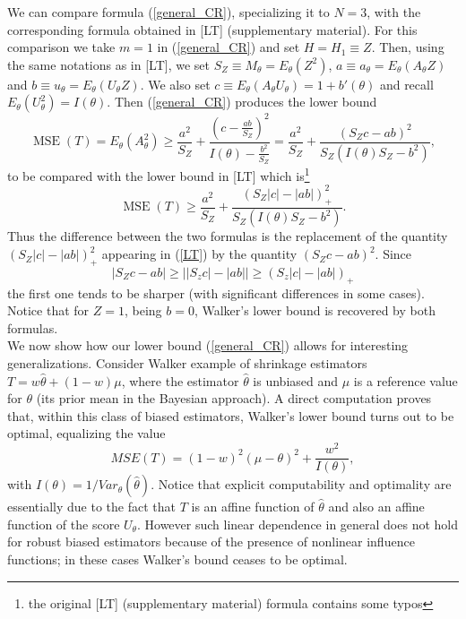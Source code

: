 \documentclass[11pt]{article}
\begin{document}
We can compare formula (\ref{general_CR}), specializing it  to $N=3$, with the corresponding formula obtained in [LT] (supplementary material). For this comparison we take $m=1$ in (\ref{general_CR}) and set $H=H_1\equiv Z$. Then, using the same notations as in [LT], we set
$S_Z\equiv M_\theta=E_\theta(Z^2)$, $a\equiv a_\theta=E_\theta(A_\theta Z)$ and $b\equiv u_\theta=E_\theta(U_\theta Z)$.
We also set $c\equiv E_\theta(A_\theta U_\theta)=1+b'(\theta)$ and recall $E_\theta(U_\theta^2)=I(\theta)$. Then (\ref{general_CR}) produces the lower bound
\begin{equation}\label{me}
\operatorname{MSE}(T)=E_\theta(A_\theta^2)
\geq
\frac{a^2}{S_Z}
+
\frac{
\left(
c-\frac{ab}{S_Z}
\right)^2
}{
I(\theta)-\frac{b^2}{S_Z}
}=\frac{a^2}{S_Z}
+
\frac{
\left(
S_Zc-ab
\right)^2
}{
S_Z\left(I(\theta)S_Z-b^2\right)
},
\end{equation}
to be compared with the lower bound in [LT] which is\footnote{the original [LT] (supplementary material) formula contains some typos}
\begin{equation}\label{LT}
\operatorname{MSE}(T)
\geq
\frac{a^2}{S_Z}
+
\frac{
\left(
S_Z|c|-|ab|
\right)_{+}^2
}{
S_Z\left(I(\theta)S_Z-b^2\right)
}.
\end{equation}
Thus the difference between the two formulas is the replacement of the quantity  $(S_Z|c|-|ab|)^2_{+}$ appearing in (\ref{LT}) by the quantity $(S_Zc-ab)^2$. Since
$$
|S_Zc-ab|\geq \bigg||S_zc|-|ab|\bigg|\geq (S_z|c|-|ab|)_{+}
$$
 the first one tends to be sharper (with significant differences  in some cases). Notice that for $Z=1$, being $b=0$, Walker's lower bound is recovered by both formulas.\\
We now show how our lower bound (\ref{general_CR}) allows for interesting generalizations. Consider Walker example of shrinkage estimators $T=w\widehat\theta+(1-w)\mu$, where the estimator $\widehat\theta$ is unbiased and $\mu$ is a reference value for $\theta$ (its prior mean in the Bayesian approach). A direct computation proves that, within this class of biased estimators, Walker's lower bound turns out to be optimal, equalizing the value
\begin{equation}\label{optimal}
MSE(T)=(1-w)^2(\mu-\theta)^2+\frac{w^2}{I(\theta)},
\end{equation}
with $I(\theta)=1/Var_{\theta}(\widehat\theta)$. Notice that explicit computability and optimality  are essentially due to the fact that $T$ is an affine function of $\widehat\theta$ and also an affine function of the score $U_{\theta}$. However such linear dependence in general does not hold for robust biased estimators because of the presence of nonlinear influence functions; in these cases Walker's bound ceases to be optimal.\\
\end{document}
